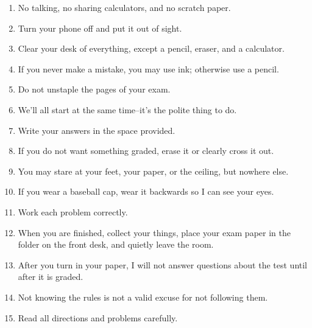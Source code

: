 \documentclass[12pt,fleqn]{exam}
\begin{document}
\begin{tcolorbox}
\begin{minipage}{6.5in}
\begin{enumerate}
    \item No talking, no sharing calculators, and no scratch paper.
    \item  Turn your phone off and put it out of sight.
    \item  Clear your desk of everything, except a pencil, eraser, and a calculator.
    \item If you never make a mistake, you may use ink; otherwise use a pencil.
    \item Do not unstaple the pages of your exam.
    \item We'll all start at the same time--it's the polite thing to do.
    \item Write your answers in the space provided. 
    \item If you do not want something graded, erase it or clearly cross it out. 
    \item You may stare at your feet, your paper, or the ceiling, but nowhere else. 
    \item If you wear a  baseball cap, wear it backwards so I can see your eyes.
    \item Work each problem correctly.
    \item When you are finished, collect your things, place your exam paper in the folder on the front desk,
    and quietly leave the room.
    \item After you turn in your paper, I will not answer questions about the test until after it is graded.
    
    \item Not knowing the rules is not a valid excuse for not following them.
   
    \item Read all directions and problems carefully. 
    \end{enumerate} 
    \end{minipage} 
    
    \end{tcolorbox}
    
    \newpage
\end{document}
